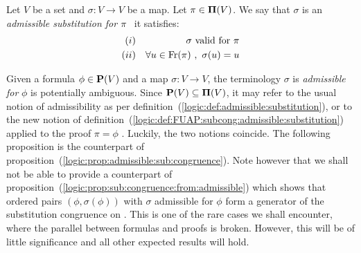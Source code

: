 \begin{defin}\label{logic:def:FUAP:subcong:admissible:substitution}
Let $V$ be a set and $\sigma:V\to V$ be a map. Let $\pi\in\mbox{${\bf\Pi}(V)$}$. We
say that $\sigma$ is an {\em admissible substitution for $\pi$}
\ifand\ it satisfies:
    \begin{eqnarray*}
    (i)&&\mbox{$\sigma$ valid for $\pi$}\\
    (ii)&&\forall u\in\mbox{\rm Fr}(\pi)\ ,\ \sigma(u)=u
    \end{eqnarray*}
\end{defin}
Given a formula $\phi\in\mbox{${\bf P}(V)$}$ and a map $\sigma:V\to V$, the
terminology $\sigma$ is {\em admissible for} $\phi$ is potentially
ambiguous. Since $\mbox{${\bf P}(V)$}\subseteq\mbox{${\bf\Pi}(V)$}$, it may refer to the usual
notion of admissibility as per
definition~(\ref{logic:def:admissible:substitution}), or to the new
notion of
definition~(\ref{logic:def:FUAP:subcong:admissible:substitution})
applied to the proof $\pi=\phi$ . Luckily, the two notions coincide.
The following proposition is the counterpart of
proposition~(\ref{logic:prop:admissible:sub:congruence}). Note
however that we shall not be able to provide a counterpart of
proposition~(\ref{logic:prop:sub:congruence:from:admissible}) which
shows that ordered pairs $(\phi,\sigma(\phi))$ with $\sigma$
admissible for $\phi$ form a generator of the substitution
congruence on \pv. This is one of the rare cases we shall encounter,
where the parallel between formulas and proofs is broken. However,
this will be of little significance and all other expected results
will hold.




